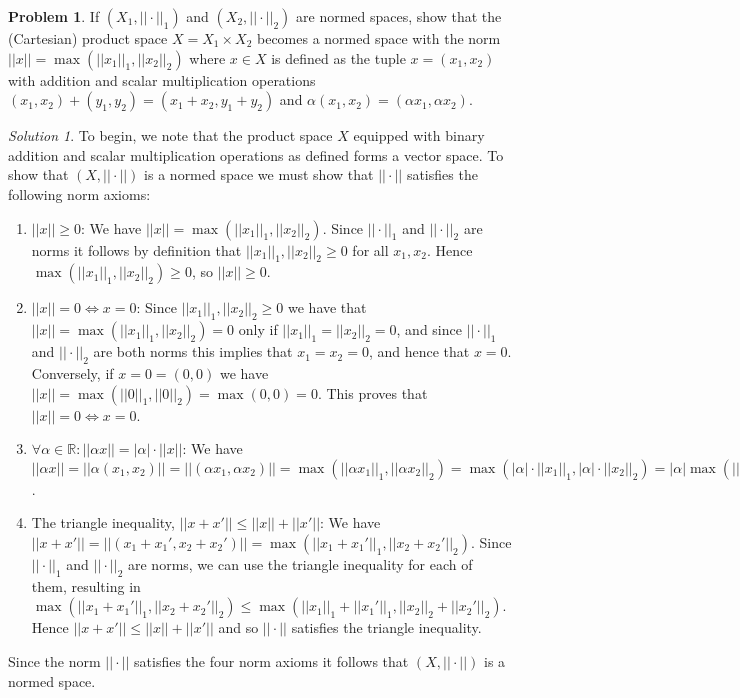 \documentclass[12pt,a4paper]{article}
\theoremstyle{definition}
\newtheorem{problem}{Problem}
\theoremstyle{remark}
\newtheorem*{solution}{Solution}
\begin{document}
\begin{problem}
    If $(X_1, ||\cdot||_1)$ and $(X_2, ||\cdot||_2)$ are normed spaces, show that the (Cartesian) product space $X=X_1 \times X_2$ becomes a normed space with the norm $||x|| = \max(||x_1||_1, ||x_2||_2)$ where $x\in X$ is defined as the tuple $x=(x_1,x_2)$ with addition and scalar multiplication operations $(x_1, x_2)+(y_1, y_2) = (x_1+x_2, y_1+y_2)$ and $\alpha(x_1, x_2) = (\alpha x_1, \alpha x_2)$. 
\end{problem}
\begin{solution}
    To begin, we note that the product space $X$ equipped with binary addition and scalar multiplication operations as defined forms a vector space. To show that $(X, ||\cdot||)$ is a normed space we must show that $||\cdot||$ satisfies the following norm axioms:
    \begin{enumerate}
        \item $||x||\ge 0$: We have $||x|| = \max(||x_1||_1, ||x_2||_2)$. Since $||\cdot||_1$ and $||\cdot||_2$ are norms it follows by definition that $||x_1||_1, ||x_2||_2 \ge 0$ for all $x_1, x_2$. Hence $\max(||x_1||_1, ||x_2||_2) \ge 0$, so $||x|| \ge 0$. 
        \item $||x||=0 \Leftrightarrow x=0$: Since $||x_1||_1, ||x_2||_2 \ge 0$ we have that $||x||=\max(||x_1||_1, ||x_2||_2) = 0$ only if $||x_1||_1 = ||x_2||_2 = 0$, and since $||\cdot||_1$ and $||\cdot||_2$ are both norms this implies that $x_1=x_2=0$, and hence that $x=0$. Conversely, if $x=0=(0,0)$ we have $||x||=\max(||0||_1, ||0||_2)=\max(0,0)=0$. This proves that $||x||=0 \Leftrightarrow x=0$.
        \item $\forall \alpha \in \mathbb R: ||\alpha x|| = |\alpha| \cdot ||x||$: We have $||\alpha x|| = ||\alpha (x_1, x_2)|| = ||(\alpha x_1, \alpha x_2)|| = \max(||\alpha x_1||_1, ||\alpha x_2||_2) = \max(|\alpha| \cdot ||x_1||_1, |\alpha|\cdot||x_2||_2) =  
        |\alpha| \max(||x_1||_1, ||x_2||_2) = |\alpha| \cdot ||x||$. 
        \item The triangle inequality, $||x + x'|| \le ||x||+||x'||$: We have $||x+x'|| = ||(x_1 + x_1', x_2+x_2')|| = \max(||x_1+x_1'||_1, ||x_2+x_2'||_2)$. Since $||\cdot||_1$ and $||\cdot||_2$ are norms, we can use the triangle inequality for each of them, resulting in $\max(||x_1+x_1'||_1, ||x_2+x_2'||_2) \le \max(||x_1||_1+||x_1'||_1, ||x_2||_2+||x_2'||_2)$. Hence $||x+x'|| \le ||x|| + ||x'||$ and so $||\cdot||$ satisfies the triangle inequality.
    \end{enumerate}

    Since the norm $||\cdot||$ satisfies the four norm axioms it follows that $(X, ||\cdot||)$ is a normed space.
\end{solution}
\end{document}
